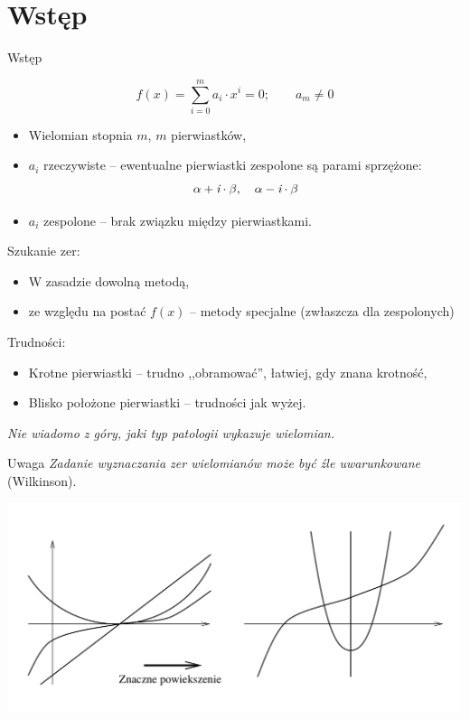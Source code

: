 \section{Wstęp}

\begin{frame}{Wstęp}
  \begin{block}{}
    $$ f(x) = \sum_{i=0}^m a_i \cdot x^i = 0; \qquad a_m \neq 0 $$
  \end{block}

  \begin{itemize}
    \item Wielomian stopnia $m$, $m$ pierwiastków,
    \item $a_i$ rzeczywiste -- ewentualne pierwiastki zespolone są parami sprzężone:
    $$ \alpha + \textit{\textrm{i}} \cdot \beta, \quad \alpha - \textit{\textrm{i}} \cdot \beta $$
    \item $a_i$ zespolone -- brak związku między pierwiastkami.
  \end{itemize}
\end{frame}

\begin{frame}
  Szukanie zer:
  \begin{itemize}
    \item W zasadzie dowolną metodą,
    \item ze względu na postać $f(x)$ -- metody specjalne (zwłaszcza dla zespolonych)
  \end{itemize}

  Trudności:
  \begin{itemize}
    \item Krotne pierwiastki -- trudno ,,obramować'', łatwiej, gdy znana krotność,
    \item Blisko położone pierwiastki -- trudności jak wyżej.
  \end{itemize}

  \textit{Nie wiadomo z góry, jaki typ patologii wykazuje wielomian.}

  \vspace{5px}

  \begin{alertblock}{Uwaga}
      \textit{Zadanie wyznaczania zer wielomianów może być źle uwarunkowane} (Wilkinson).
  \end{alertblock}
\end{frame}

\begin{frame}
  \includegraphics[width=\textwidth]{img/8/wielomian}
\end{frame}
